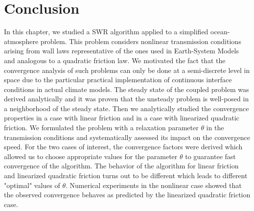 \section{Conclusion}
In this chapter, we studied a SWR %
algorithm applied
to a simplified ocean-atmosphere problem. 
This problem considers nonlinear transmission conditions arising 
from wall laws representative of the ones used in Earth-System Models
and analogous to a quadratic friction law. We 
motivated the fact that the convergence analysis of such 
problems can only be done at a semi-discrete level in space due to the particular practical implementation of continuous interface conditions in actual climate models.  
The steady state of the coupled problem was derived analytically
and it was proven that the unsteady problem is well-posed
in a neighborhood of the steady state.
Then we analytically studied the convergence properties in a
case with linear friction and in a case with linearized 
quadratic friction. We formulated the problem with a 
relaxation parameter $\theta$ in the transmission conditions and 
systematically assessed its impact on the convergence speed. 
%
%
%
%
For the two cases of interest, the convergence factors were derived
which allowed us to choose appropriate values
for the parameter $\theta$ to guarantee fast convergence of the algorithm.
%
The behavior of the algorithm for linear friction and linearized 
quadratic friction turns out to be different which leads to different
"optimal" values of $\theta$. 
%
%
Numerical experiments in the nonlinear case showed that the observed 
convergence behaves as predicted by the linearized quadratic friction
case.
